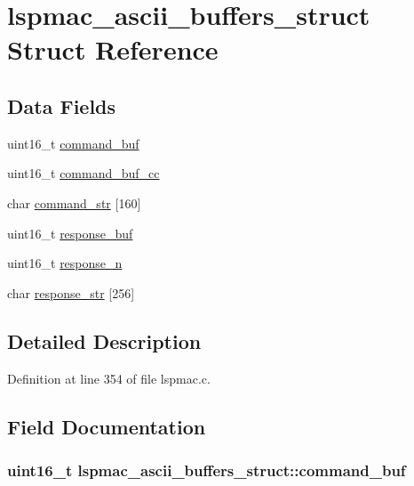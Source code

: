 \hypertarget{structlspmac__ascii__buffers__struct}{\section{lspmac\-\_\-ascii\-\_\-buffers\-\_\-struct Struct Reference}
\label{structlspmac__ascii__buffers__struct}
}
\subsection*{Data Fields}
\begin{DoxyCompactItemize}
\item 
uint16\-\_\-t \hyperlink{structlspmac__ascii__buffers__struct_ad92fe7e16e5e67ec4c115a6b86890faa}{command\-\_\-buf}
\item 
uint16\-\_\-t \hyperlink{structlspmac__ascii__buffers__struct_a4d11efeb1eef407d811d3f9b774adc54}{command\-\_\-buf\-\_\-cc}
\item 
char \hyperlink{structlspmac__ascii__buffers__struct_abe6a433dd9be4781dbf7e31d16484a4b}{command\-\_\-str} \mbox{[}160\mbox{]}
\item 
uint16\-\_\-t \hyperlink{structlspmac__ascii__buffers__struct_ae1d37cf9568478c9d8dad540ce77183c}{response\-\_\-buf}
\item 
uint16\-\_\-t \hyperlink{structlspmac__ascii__buffers__struct_a97c2fdd21eec29c2cba993e361c3c069}{response\-\_\-n}
\item 
char \hyperlink{structlspmac__ascii__buffers__struct_a32c4baecf20143eb71d348b6b5679039}{response\-\_\-str} \mbox{[}256\mbox{]}
\end{DoxyCompactItemize}


\subsection{Detailed Description}


Definition at line 354 of file lspmac.\-c.



\subsection{Field Documentation}
\hypertarget{structlspmac__ascii__buffers__struct_ad92fe7e16e5e67ec4c115a6b86890faa}{
\subsubsection[{command\-\_\-buf}]{\setlength{\rightskip}{0pt plus 5cm}uint16\-\_\-t lspmac\-\_\-ascii\-\_\-buffers\-\_\-struct\-::command\-\_\-buf}}\label{structlspmac__ascii__buffers__struct_ad92fe7e16e5e67ec4c115a6b86890faa}


